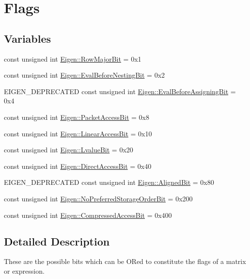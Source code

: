 \hypertarget{group__flags}{}\section{Flags}
\label{group__flags}
\subsection*{Variables}
\begin{DoxyCompactItemize}
\item 
const unsigned int \mbox{\hyperlink{group__flags_gae4f56c2a60bbe4bd2e44c5b19cbe8762}{Eigen\+::\+Row\+Major\+Bit}} = 0x1
\item 
const unsigned int \mbox{\hyperlink{group__flags_gaa34e83bae46a8eeae4e69ebe3aaecbed}{Eigen\+::\+Eval\+Before\+Nesting\+Bit}} = 0x2
\item 
E\+I\+G\+E\+N\+\_\+\+D\+E\+P\+R\+E\+C\+A\+T\+ED const unsigned int \mbox{\hyperlink{group__flags_ga0972b20dc004d13984e642b3bd12532e}{Eigen\+::\+Eval\+Before\+Assigning\+Bit}} = 0x4
\item 
const unsigned int \mbox{\hyperlink{group__flags_ga1a306a438e1ab074e8be59512e887b9f}{Eigen\+::\+Packet\+Access\+Bit}} = 0x8
\item 
const unsigned int \mbox{\hyperlink{group__flags_ga4b983a15d57cd55806df618ac544d09e}{Eigen\+::\+Linear\+Access\+Bit}} = 0x10
\item 
const unsigned int \mbox{\hyperlink{group__flags_gae2c323957f20dfdc6cb8f44428eaec1a}{Eigen\+::\+Lvalue\+Bit}} = 0x20
\item 
const unsigned int \mbox{\hyperlink{group__flags_gabf1e9d0516a933445a4c307ad8f14915}{Eigen\+::\+Direct\+Access\+Bit}} = 0x40
\item 
E\+I\+G\+E\+N\+\_\+\+D\+E\+P\+R\+E\+C\+A\+T\+ED const unsigned int \mbox{\hyperlink{group__flags_gac5795adacd266512a26890973503ed88}{Eigen\+::\+Aligned\+Bit}} = 0x80
\item 
const unsigned int \mbox{\hyperlink{group__flags_ga3c186ad80ddcf5e2ed3d7ee31cca1860}{Eigen\+::\+No\+Preferred\+Storage\+Order\+Bit}} = 0x200
\item 
const unsigned int \mbox{\hyperlink{group__flags_gaed0244284da47a2b8661261431173caf}{Eigen\+::\+Compressed\+Access\+Bit}} = 0x400
\end{DoxyCompactItemize}


\subsection{Detailed Description}
These are the possible bits which can be OR\textquotesingle{}ed to constitute the flags of a matrix or expression.

